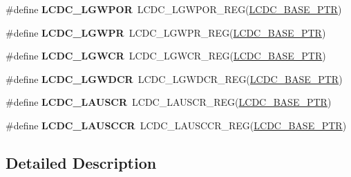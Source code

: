 \begin{DoxyCompactItemize}
\item 
\hypertarget{group___l_c_d_c___register___accessor___macros_gacd6492368ba7708ba68e9607f56667bb}{}\#define {\bfseries L\+C\+D\+C\+\_\+\+L\+G\+W\+P\+O\+R}~L\+C\+D\+C\+\_\+\+L\+G\+W\+P\+O\+R\+\_\+\+R\+E\+G(\hyperlink{group___l_c_d_c___peripheral_ga87dd9b3292c2c039290038a24dda01c4}{L\+C\+D\+C\+\_\+\+B\+A\+S\+E\+\_\+\+P\+T\+R})\label{group___l_c_d_c___register___accessor___macros_gacd6492368ba7708ba68e9607f56667bb}

\item 
\hypertarget{group___l_c_d_c___register___accessor___macros_gaee64fe845acc69bdda3b8ad9123d9e5f}{}\#define {\bfseries L\+C\+D\+C\+\_\+\+L\+G\+W\+P\+R}~L\+C\+D\+C\+\_\+\+L\+G\+W\+P\+R\+\_\+\+R\+E\+G(\hyperlink{group___l_c_d_c___peripheral_ga87dd9b3292c2c039290038a24dda01c4}{L\+C\+D\+C\+\_\+\+B\+A\+S\+E\+\_\+\+P\+T\+R})\label{group___l_c_d_c___register___accessor___macros_gaee64fe845acc69bdda3b8ad9123d9e5f}

\item 
\hypertarget{group___l_c_d_c___register___accessor___macros_gaa343eab259683cd48fe15fc5c4902747}{}\#define {\bfseries L\+C\+D\+C\+\_\+\+L\+G\+W\+C\+R}~L\+C\+D\+C\+\_\+\+L\+G\+W\+C\+R\+\_\+\+R\+E\+G(\hyperlink{group___l_c_d_c___peripheral_ga87dd9b3292c2c039290038a24dda01c4}{L\+C\+D\+C\+\_\+\+B\+A\+S\+E\+\_\+\+P\+T\+R})\label{group___l_c_d_c___register___accessor___macros_gaa343eab259683cd48fe15fc5c4902747}

\item 
\hypertarget{group___l_c_d_c___register___accessor___macros_ga2b0e2d1593024e80431a8fa9ff5523cc}{}\#define {\bfseries L\+C\+D\+C\+\_\+\+L\+G\+W\+D\+C\+R}~L\+C\+D\+C\+\_\+\+L\+G\+W\+D\+C\+R\+\_\+\+R\+E\+G(\hyperlink{group___l_c_d_c___peripheral_ga87dd9b3292c2c039290038a24dda01c4}{L\+C\+D\+C\+\_\+\+B\+A\+S\+E\+\_\+\+P\+T\+R})\label{group___l_c_d_c___register___accessor___macros_ga2b0e2d1593024e80431a8fa9ff5523cc}

\item 
\hypertarget{group___l_c_d_c___register___accessor___macros_gade2bc6cf7fafbe0e683ec55162ea2769}{}\#define {\bfseries L\+C\+D\+C\+\_\+\+L\+A\+U\+S\+C\+R}~L\+C\+D\+C\+\_\+\+L\+A\+U\+S\+C\+R\+\_\+\+R\+E\+G(\hyperlink{group___l_c_d_c___peripheral_ga87dd9b3292c2c039290038a24dda01c4}{L\+C\+D\+C\+\_\+\+B\+A\+S\+E\+\_\+\+P\+T\+R})\label{group___l_c_d_c___register___accessor___macros_gade2bc6cf7fafbe0e683ec55162ea2769}

\item 
\hypertarget{group___l_c_d_c___register___accessor___macros_ga5c2942bccc66fa1fc1da7c9de9e381af}{}\#define {\bfseries L\+C\+D\+C\+\_\+\+L\+A\+U\+S\+C\+C\+R}~L\+C\+D\+C\+\_\+\+L\+A\+U\+S\+C\+C\+R\+\_\+\+R\+E\+G(\hyperlink{group___l_c_d_c___peripheral_ga87dd9b3292c2c039290038a24dda01c4}{L\+C\+D\+C\+\_\+\+B\+A\+S\+E\+\_\+\+P\+T\+R})\label{group___l_c_d_c___register___accessor___macros_ga5c2942bccc66fa1fc1da7c9de9e381af}

\end{DoxyCompactItemize}


\subsection{Detailed Description}
